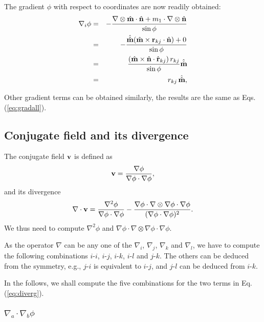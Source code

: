 \documentclass{article}
\begin{document}
The gradient $\phi$ with respect to coordinates are now readily obtained:
\begin{eqnarray*}
\nabla_i \phi &=& -\frac{ \nabla \otimes \hat{\mathbf{m}} \cdot \hat{\mathbf{n}}  + m_1 \cdot \nabla \otimes \hat{\mathbf{n}} }
                  {\sin \phi} \\
              &=& -\frac{ \hat{\hat{\mathbf{m}}} (\hat{\mathbf{m}} \times \mathbf{r}_{kj} \cdot \hat{\mathbf{n}}) + 0 }
                  {\sin \phi} \\
              &=& \frac{ (\hat{\mathbf{m}} \times \hat{\mathbf{n}} \cdot \hat{\mathbf{r}}_{kj}) \, r_{kj} }
                  {\sin \phi} \hat{\hat{\mathbf{m}}} \\
              &=& r_{kj} \, \hat{\hat{\mathbf{m}}},
\end{eqnarray*}

Other gradient terms can be obtained similarly, the results are the same as Eqs. (\ref{eq:gradall}).




\subsection{Conjugate field and its divergence}


The conjugate field $\mathbf{v}$ is defined as
\begin{equation}
\mathbf{v} = \frac {\nabla \phi} {\nabla \phi \cdot \nabla \phi},
\end{equation}
and its divergence
\begin{equation}
\nabla \cdot \mathbf{v}  = 
   \frac {\nabla^2 \phi} 
         {\nabla \phi \cdot \nabla \phi}
 - \frac {\nabla \phi \cdot \nabla \otimes \nabla \phi \cdot \nabla \phi} 
         {(\nabla \phi \cdot \nabla \phi)^2}.
\label{eq:diverg}
\end{equation}
%
We thus need to compute 
$\nabla^2 \phi$
and
$\nabla \phi \cdot \nabla \otimes \nabla \phi \cdot \nabla \phi$.


As the operator $\nabla$ can be any one of the 
$\nabla_i$, $\nabla_j$, $\nabla_k$ and $\nabla_l$,
we have to compute the following combinations 
$i$-$i$, $i$-$j$, $i$-$k$, $i$-$l$ and $j$-$k$.
%
The others can be deduced from the symmetry, 
e.g., 
$j$-$i$ is equivalent to $i$-$j$, and
$j$-$l$ can be deduced from $i$-$k$.

In the follows, we shall compute the five combinations for the two terms in 
Eq. (\ref{eq:diverg}).

\subsubsection{$\nabla_a \cdot \nabla_b \phi$}
\end{document}
